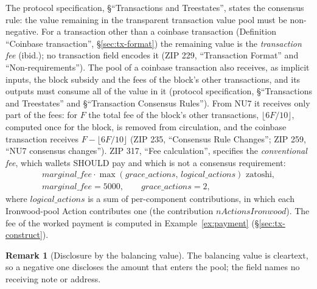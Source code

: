 \documentclass[11pt,a4paper]{article}
\theoremstyle{definition}
\newtheorem{remark}[theorem]{Remark}
\begin{document}
The protocol specification, \S``Transactions and Treestates'', states the
consensus rule: the value remaining in the transparent transaction value
pool must be non-negative. For a transaction other than a coinbase
transaction (Definition ``Coinbase transaction'', \S\ref{sec:tx-format}) the
remaining value is the \emph{transaction fee} (ibid.); no transaction field
encodes it (ZIP 229, ``Transaction Format'' and ``Non-requirements''). The
pool of a coinbase transaction also receives, as implicit inputs, the block
subsidy and the fees of the block's other transactions, and its outputs must
consume all of the value in it (protocol specification, \S``Transactions and
Treestates'' and \S``Transaction Consensus Rules''). From NU7 it receives
only part of the fees: for $F$ the total fee of the block's other
transactions, $\lfloor 6F/10 \rfloor$, computed once for the block, is
removed from circulation, and the coinbase transaction receives
$F - \lfloor 6F/10 \rfloor$ (ZIP 235, ``Consensus Rule Changes''; ZIP 259,
``NU7 consensus changes''). ZIP 317, ``Fee calculation'', specifies the
\emph{conventional fee}, which wallets SHOULD pay and which is not a
consensus requirement:
\begin{gather*}
  \mathit{marginal\_fee} \cdot \max(\mathit{grace\_actions},\,
    \mathit{logical\_actions}) \text{ zatoshi}, \\
  \mathit{marginal\_fee} = 5000, \qquad \mathit{grace\_actions} = 2,
\end{gather*}
where $\mathit{logical\_actions}$ is a sum of per-component contributions,
in which each Ironwood-pool Action contributes one (the contribution
$\mathit{nActionsIronwood}$). The fee of the worked payment is computed in
Example~\ref{ex:payment} (\S\ref{sec:tx-construct}).

\begin{remark}[Disclosure by the balancing value]
The balancing value is cleartext, so a negative one discloses the amount
that enters the pool; the field names no receiving note or address.
\end{remark}
\end{document}
